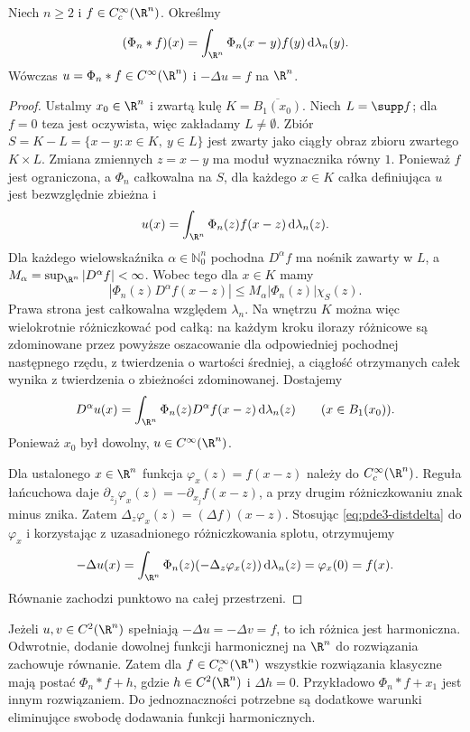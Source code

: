 \begin{twierdzenie}
\label{thm:pde3-newton}
Niech $n\geq2$ i $f\in C_c^\infty(\R^n)$. Określmy
\begin{equation}\label{eq:pde3-newton}
 (\Phi_n*f)(x)=\int_{\R^n}\Phi_n(x-y)f(y)\,
 \mathrm d\lambda_n(y).
\end{equation}
Wówczas $u=\Phi_n*f\in C^\infty(\R^n)$ i
$-\Delta u=f$ na $\R^n$.
\end{twierdzenie}
\begin{proof}
Ustalmy $x_0\in\R^n$ i zwartą kulę
$K=\overline{B_1(x_0)}$. Niech $L=\supp f$;
dla $f=0$ teza jest oczywista, więc zakładamy $L\ne\emptyset$.
Zbiór $S=K-L=\{x-y:x\in K,\ y\in L\}$ jest zwarty
jako ciągły obraz zbioru zwartego $K\times L$.
Zmiana zmiennych $z=x-y$ ma moduł wyznacznika równy $1$.
Ponieważ $f$ jest ograniczona, a $\Phi_n$ całkowalna
na $S$, dla każdego $x\in K$ całka definiująca $u$ jest
bezwzględnie zbieżna i
\[
 u(x)=\int_{\R^n}\Phi_n(z)f(x-z)\,\mathrm d\lambda_n(z).
\]
Dla każdego wielowskaźnika $\alpha\in\mathbb N_0^n$
pochodna $D^\alpha f$ ma nośnik zawarty w $L$,
a $M_\alpha=\sup_{\R^n}|D^\alpha f|<\infty$.
Wobec tego dla $x\in K$ mamy
\[
 |\Phi_n(z)D^\alpha f(x-z)|
 \leq M_\alpha|\Phi_n(z)|\chi_S(z).
\]
Prawa strona jest całkowalna względem $\lambda_n$.
Na wnętrzu $K$ można więc wielokrotnie różniczkować
pod całką: na każdym kroku ilorazy różnicowe
są zdominowane przez powyższe oszacowanie dla
odpowiedniej pochodnej następnego rzędu, z twierdzenia
o wartości średniej, a ciągłość otrzymanych całek
wynika z twierdzenia o zbieżności zdominowanej.
Dostajemy
\[
 D^\alpha u(x)=\int_{\R^n}
 \Phi_n(z)D^\alpha f(x-z)\,\mathrm d\lambda_n(z)
 \qquad(x\in B_1(x_0)).
\]
Ponieważ $x_0$ był dowolny, $u\in C^\infty(\R^n)$.

Dla ustalonego $x\in\R^n$ funkcja
$\varphi_x(z)=f(x-z)$ należy do $C_c^\infty(\R^n)$.
Reguła łańcuchowa daje
$\partial_{z_j}\varphi_x(z)=-\partial_{x_j}f(x-z)$,
a przy drugim różniczkowaniu znak minus znika.
Zatem $\Delta_z\varphi_x(z)=(\Delta f)(x-z)$.
Stosując \eqref{eq:pde3-distdelta} do $\varphi_x$
i korzystając z uzasadnionego różniczkowania splotu,
otrzymujemy
\[
 -\Delta u(x)=\int_{\R^n}
 \Phi_n(z)(-\Delta_z\varphi_x(z))\,\mathrm d\lambda_n(z)
 =\varphi_x(0)=f(x).
\]
Równanie zachodzi punktowo na całej przestrzeni.
\end{proof}

\begin{uwaga}
Jeżeli $u,v\in C^2(\R^n)$ spełniają
$-\Delta u=-\Delta v=f$, to ich różnica jest harmoniczna.
Odwrotnie, dodanie dowolnej funkcji harmonicznej
na $\R^n$ do rozwiązania zachowuje równanie.
Zatem dla $f\in C_c^\infty(\R^n)$ wszystkie rozwiązania
klasyczne mają postać $\Phi_n*f+h$, gdzie
$h\in C^2(\R^n)$ i $\Delta h=0$.
Przykładowo $\Phi_n*f+x_1$ jest innym rozwiązaniem.
Do jednoznaczności potrzebne są dodatkowe warunki
eliminujące swobodę dodawania funkcji harmonicznych.
\end{uwaga}

